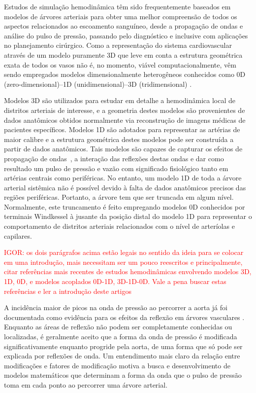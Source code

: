 \documentclass[
        english,			
        brazil			        %
        ,<...>]{abntbibufjf}
\begin{document}
Estudos de simulação hemodinâmica têm sido frequentemente baseados em modelos de árvores arteriais para obter uma melhor compreensão de todos os aspectos relacionados ao escoamento sanguíneo, desde a propagação de ondas e análise do pulso de pressão, passando pelo diagnóstico e inclusive com aplicações no planejamento cirúrgico. Como a representação do sistema cardiovascular através de um modelo puramente 3D que leve em conta a estrutura geométrica exata de todos os vasos não é, no momento, viável computacionalmente, vêm sendo empregados modelos dimensionalmente heterogêneos conhecidos como 0D (zero-dimensional)--1D (unidimensional)--3D (tridimensional) \cite{Formaggia2001}. 

Modelos 3D \cite{Peskin1972,Taylor1998} são utilizados para estudar em detalhe a hemodinâmica local de distritos arteriais de interesse, e a geometria destes modelos são provenientes de dados anatômicos obtidos normalmente via reconstrução de imagens médicas de pacientes específicos. Modelos 1D \cite{Avolio,Formaggia2003,Stergiopulos1992} são adotados para representar as artérias de maior calibre e a estrutura geométrica destes modelos pode ser construída a partir de dados anatômicos. Tais modelos são capazes de capturar os efeitos de propagação de ondas~\cite{Anliker1971,Duan}, a interação das reflexões destas ondas e dar como resultado um pulso de pressão e vazão com significado fisiológico tanto em artérias centrais como periféricas. No entanto, um modelo 1D de toda a árvore arterial sistêmica não é possível devido à falta de dados anatômicos precisos das regiões periféricas. Portanto, a árvore tem que ser truncada em algum nível. Normalmente, este truncamento é feito empregando modelos 0D \cite{Mates1988,Stergiopulos1992} conhecidos por terminais Windkessel à jusante da posição distal do modelo 1D para representar o comportamento de distritos arteriais relacionados com o nível de arteríolas e capilares. 

\textcolor{red}{IGOR: os dois parágrafos acima estão legais no sentido da ideia para se colocar em uma introdução, mais necessitam ser um pouco reescritos e principalmente, citar referências mais recentes de estudos hemodinâmicas envolvendo modelos 3D, 1D, 0D, e modelos acoplados 0D-1D, 3D-1D-0D. Vale a pena buscar estas referências e ler a introdução deste artigos}

A incidência maior de picos na onda de pressão ao percorrer a aorta já foi documentada como evidência para os efeitos da reflexão em árvores vasculares \cite{Kouchoukos,Lighthill,McDonald}. Enquanto as áreas de reflexão não podem ser completamente conhecidas ou localizadas, é geralmente aceito que a forma da onda de pressão é modificada significativamente enquanto progride pela aorta, de uma forma que só pode ser explicada por reflexões de onda.  Um entendimento mais claro da relação entre modificações e fatores de modificação motiva a busca e desenvolvimento de modelos matemáticos que determinam a forma da onda que o pulso de pressão toma em cada ponto ao percorrer uma árvore arterial. 
\end{document}
